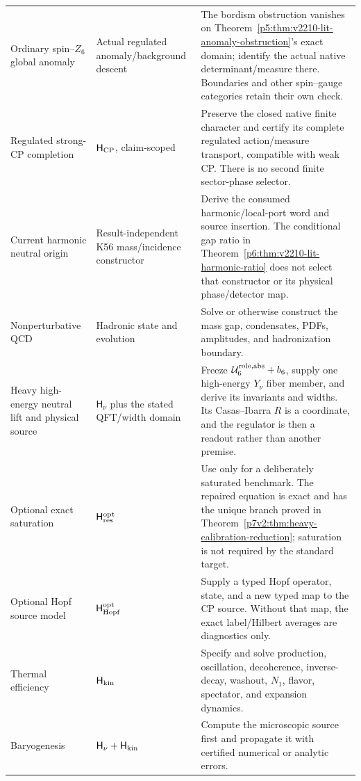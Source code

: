 \documentclass[11pt,a4paper]{article}
\newcommand{\Hkin}{\mathsf{H}_{\rm kin}}
\newcommand{\Hcp}{\mathsf{H}_{\rm CP}}
\newcommand{\Hnu}{\mathsf{H}_{\nu}}
\newcommand{\Uroleabs}{\mathcal U_6^{\rm role,abs}}
\newcommand{\Hresopt}{\mathsf H_{\rm res}^{\rm opt}}
\newcommand{\Hhopfopt}{\mathsf H_{\rm Hopf}^{\rm opt}}
\begin{document}
\begin{longtable}{@{}L{0.22\textwidth}L{0.31\textwidth}L{0.39\textwidth}@{}}
Ordinary spin--\(Z_6\) global anomaly
& Actual regulated anomaly/background descent
& The bordism obstruction vanishes on
Theorem~\ref{p5:thm:v2210-lit-anomaly-obstruction}'s exact domain;
identify the actual native determinant/measure there.  Boundaries and
other spin--gauge categories retain their own check.\\
Regulated strong-CP completion
& \(\Hcp\), claim-scoped
& Preserve the closed native finite character and certify its complete
regulated action/measure transport, compatible with weak CP.  There is no
second finite sector-phase selector.\\
Current harmonic neutral origin
& Result-independent K56 mass/incidence constructor
& Derive the consumed harmonic/local-port word and source insertion.
The conditional gap ratio in
Theorem~\ref{p6:thm:v2210-lit-harmonic-ratio} does not select that
constructor or its physical phase/detector map.\\
Nonperturbative QCD
& Hadronic state and evolution
& Solve or otherwise construct the mass gap, condensates, PDFs, amplitudes, and
hadronization boundary.\\
Heavy high-energy neutral lift and physical source
& \(\Hnu\) plus the stated QFT/width domain
& Freeze \(\Uroleabs+b_6\), supply one high-energy \(Y_\nu\) fiber member,
and derive its invariants and widths.  Its Casas--Ibarra \(R\) is a coordinate,
and the regulator is then a readout rather than another premise.\\
Optional exact saturation
& \(\Hresopt\)
& Use only for a deliberately saturated benchmark.  The repaired equation is
exact and has the unique branch proved in
Theorem~\ref{p7v2:thm:heavy-calibration-reduction}; saturation is not required
by the standard target.\\
Optional Hopf source model
& \(\Hhopfopt\)
& Supply a typed Hopf operator, state, and a new typed map to the CP source.
Without that map, the exact label/Hilbert averages are diagnostics only.\\
Thermal efficiency
& \(\Hkin\)
& Specify and solve production, oscillation, decoherence, inverse-decay,
washout, \(N_1\), flavor, spectator, and expansion dynamics.\\
Baryogenesis
& \(\Hnu+\Hkin\)
& Compute the microscopic source first and propagate it with certified
numerical or analytic errors.\\
\bottomrule
\end{longtable}
\end{document}
